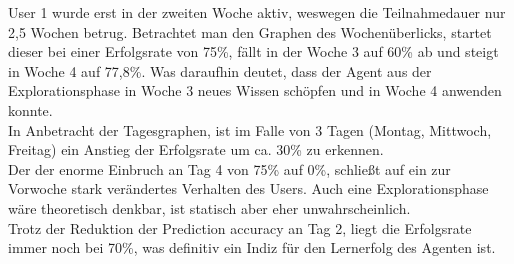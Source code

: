 User 1 wurde erst in der zweiten Woche aktiv, weswegen die Teilnahmedauer nur 2,5 Wochen betrug. 
Betrachtet man den Graphen des Wochenüberlicks, startet dieser bei einer Erfolgsrate von 75\%, fällt in der Woche 3 auf 60\% ab und steigt in Woche 4 auf 77,8\%. Was daraufhin deutet, dass der Agent aus der Explorationsphase in Woche 3 neues Wissen schöpfen und in Woche 4 anwenden konnte.\\
In Anbetracht der Tagesgraphen, ist im Falle von 3 Tagen (Montag, Mittwoch, Freitag) ein Anstieg der Erfolgsrate um ca. 30\% zu erkennen. \\
Der der enorme Einbruch an Tag 4 von 75\% auf 0\%, schließt auf ein zur Vorwoche stark verändertes Verhalten des Users. Auch eine Explorationsphase wäre theoretisch denkbar, ist statisch aber eher unwahrscheinlich.\\
Trotz der Reduktion der Prediction accuracy an Tag 2, liegt die Erfolgsrate immer noch bei 70\%, was definitiv ein Indiz für den Lernerfolg des Agenten ist. 


    


\clearpage
\newpage

